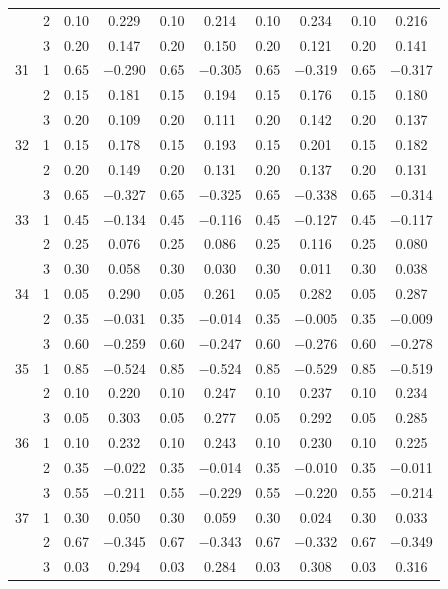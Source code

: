 \begin{longtable}{llcccccccc}
   & 2 & 0.10 & 0.229 & 0.10 & 0.214 & 0.10 & 0.234 & 0.10 & 0.216 \\ 
   & 3 & 0.20 & 0.147 & 0.20 & 0.150 & 0.20 & 0.121 & 0.20 & 0.141 \\ 
  31 & 1 & 0.65 & $-$0.290 & 0.65 & $-$0.305 & 0.65 & $-$0.319 & 0.65 & $-$0.317 \\ 
   & 2 & 0.15 & 0.181 & 0.15 & 0.194 & 0.15 & 0.176 & 0.15 & 0.180 \\ 
   & 3 & 0.20 & 0.109 & 0.20 & 0.111 & 0.20 & 0.142 & 0.20 & 0.137 \\ 
  32 & 1 & 0.15 & 0.178 & 0.15 & 0.193 & 0.15 & 0.201 & 0.15 & 0.182 \\ 
   & 2 & 0.20 & 0.149 & 0.20 & 0.131 & 0.20 & 0.137 & 0.20 & 0.131 \\ 
   & 3 & 0.65 & $-$0.327 & 0.65 & $-$0.325 & 0.65 & $-$0.338 & 0.65 & $-$0.314 \\ 
  33 & 1 & 0.45 & $-$0.134 & 0.45 & $-$0.116 & 0.45 & $-$0.127 & 0.45 & $-$0.117 \\ 
   & 2 & 0.25 & 0.076 & 0.25 & 0.086 & 0.25 & 0.116 & 0.25 & 0.080 \\ 
   & 3 & 0.30 & 0.058 & 0.30 & 0.030 & 0.30 & 0.011 & 0.30 & 0.038 \\ 
  34 & 1 & 0.05 & 0.290 & 0.05 & 0.261 & 0.05 & 0.282 & 0.05 & 0.287 \\ 
   & 2 & 0.35 & $-$0.031 & 0.35 & $-$0.014 & 0.35 & $-$0.005 & 0.35 & $-$0.009 \\ 
   & 3 & 0.60 & $-$0.259 & 0.60 & $-$0.247 & 0.60 & $-$0.276 & 0.60 & $-$0.278 \\ 
  35 & 1 & 0.85 & $-$0.524 & 0.85 & $-$0.524 & 0.85 & $-$0.529 & 0.85 & $-$0.519 \\ 
   & 2 & 0.10 & 0.220 & 0.10 & 0.247 & 0.10 & 0.237 & 0.10 & 0.234 \\ 
   & 3 & 0.05 & 0.303 & 0.05 & 0.277 & 0.05 & 0.292 & 0.05 & 0.285 \\ 
  36 & 1 & 0.10 & 0.232 & 0.10 & 0.243 & 0.10 & 0.230 & 0.10 & 0.225 \\ 
   & 2 & 0.35 & $-$0.022 & 0.35 & $-$0.014 & 0.35 & $-$0.010 & 0.35 & $-$0.011 \\ 
   & 3 & 0.55 & $-$0.211 & 0.55 & $-$0.229 & 0.55 & $-$0.220 & 0.55 & $-$0.214 \\ 
  37 & 1 & 0.30 & 0.050 & 0.30 & 0.059 & 0.30 & 0.024 & 0.30 & 0.033 \\ 
   & 2 & 0.67 & $-$0.345 & 0.67 & $-$0.343 & 0.67 & $-$0.332 & 0.67 & $-$0.349 \\ 
   & 3 & 0.03 & 0.294 & 0.03 & 0.284 & 0.03 & 0.308 & 0.03 & 0.316 \\ 

\end{longtable}
